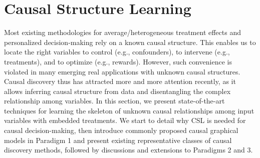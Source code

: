 \section{Causal Structure Learning}\label{Sec:CSL}

Most existing methodologies for average/heterogeneous treatment effects and personalized decision-making rely on a known causal structure. This enables us to locate the right variables to control (e.g., confounders), to intervene (e.g., treatments), and to optimize (e.g., rewards). However, such convenience is violated in many emerging real applications with unknown causal structures. Causal discovery thus has attracted more and more attention recently, as it allows inferring causal structure from data and disentangling the complex relationship among variables.  In this section, we present state-of-the-art techniques for learning the skeleton of unknown causal relationships among input variables with embedded treatments. We start to detail why \acrshort{CSL} is needed for causal decision-making, then introduce commonly proposed causal graphical models in Paradigm 1 and present existing representative classes of causal discovery methods, followed by discussions and extensions to Paradigms 2 and 3. 



